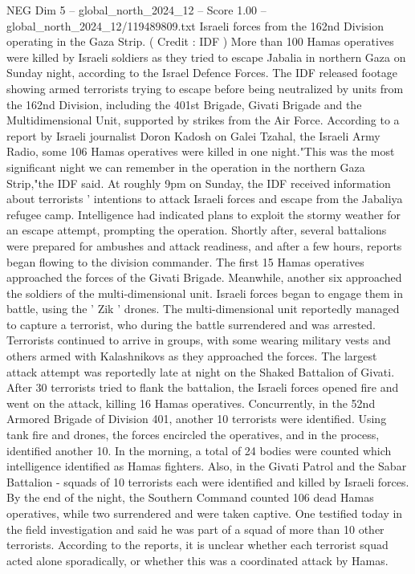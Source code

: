 \begin{textsample}{NEG Dim 5 – global\_north\_2024\_12 – Score 1.00 – global\_north\_2024\_12/119489809.txt}  \label{ex:f5_neg_358}
Israeli forces from the 162nd Division operating in the Gaza Strip. ( Credit : IDF ) More than 100 Hamas operatives were killed by Israeli soldiers as they tried to escape Jabalia in northern Gaza on Sunday night, according to the Israel Defence Forces.
The IDF released footage showing armed terrorists trying to escape before being neutralized by units from the 162nd Division, including the 401st Brigade, Givati Brigade and the Multidimensional Unit, supported by strikes from the Air Force.
According to a report by Israeli journalist Doron Kadosh on Galei Tzahal, the Israeli Army Radio, some 106 Hamas operatives were killed in one night."This was the most significant night we can remember in the operation in the northern Gaza Strip,"the IDF said.
At roughly 9pm on Sunday, the IDF received information about terrorists ' intentions to attack Israeli forces and escape from the Jabaliya refugee camp.
Intelligence had indicated plans to exploit the stormy weather for an escape attempt, prompting the operation.
Shortly after, several battalions were prepared for ambushes and attack readiness, and after a few hours, reports began flowing to the division commander.
The first 15 Hamas operatives approached the forces of the Givati Brigade.
Meanwhile, another six approached the soldiers of the multi-dimensional unit.
Israeli forces began to engage them in battle, using the ' Zik ' drones.
The multi-dimensional unit reportedly managed to capture a terrorist, who during the battle surrendered and was arrested.
Terrorists continued to arrive in groups, with some wearing military vests and others armed with Kalashnikovs as they approached the forces.
The largest attack attempt was reportedly late at night on the Shaked Battalion of Givati.
After 30 terrorists tried to flank the battalion, the Israeli forces opened fire and went on the attack, killing 16 Hamas operatives.
Concurrently, in the 52nd Armored Brigade of Division 401, another 10 terrorists were identified.
Using tank fire and drones, the forces encircled the operatives, and in the process, identified another 10.
In the morning, a total of 24 bodies were counted which intelligence identified as Hamas fighters.
Also, in the Givati Patrol and the Sabar Battalion - squads of 10 terrorists each were identified and killed by Israeli forces.
By the end of the night, the Southern Command counted 106 dead Hamas operatives, while two surrendered and were taken captive.
One testified today in the field investigation and said he was part of a squad of more than 10 other terrorists.
According to the reports, it is unclear whether each terrorist squad acted alone sporadically, or whether this was a coordinated attack by Hamas.

\end{textsample}
